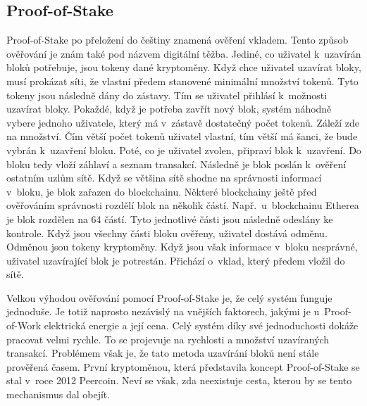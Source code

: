 \documentclass[12pt]{report}			%
\begin{document}
		\subsection{Proof-of-Stake}{
Proof-of-Stake po přeložení do češtiny znamená ověření vkladem. Tento způsob ověřování je znám také pod názvem digitální těžba. Jediné, co uživatel k~uzavírán bloků potřebuje, jsou tokeny dané kryptoměny. Když chce uživatel uzavírat bloky, musí prokázat síti, že vlastní předem stanovené minimální množství tokenů. Tyto tokeny jsou následně dány do zástavy. Tím se uživatel přihlásí k~možnosti uzavírat bloky. Pokaždé, když je potřeba zavřít nový blok, systém náhodně vybere jednoho uživatele, který má v~zástavě dostatečný počet tokenů. Záleží zde na množství. Čím větší počet tokenů uživatel vlastní, tím větší má šanci, že bude vybrán k~uzavření bloku. Poté, co je uživatel zvolen, připraví blok k~uzavření. Do bloku tedy vloží záhlaví a seznam transakcí. Následně je blok poslán k~ověření ostatním uzlům sítě. Když se většina sítě shodne na správnosti informací v~bloku, je blok zařazen do blockchainu. Některé blockchainy ještě před ověřováním správnosti rozdělí blok na několik částí. Např.\, u~blockchainu Etherea je blok rozdělen na 64 částí. Tyto jednotlivé části jsou následně odeslány ke kontrole. Když jsou všechny části bloku ověřeny, uživatel dostává odměnu. Odměnou jsou tokeny kryptoměny. Když jsou však informace v~bloku nesprávné, uživatel uzavírající blok je potrestán. Přichází o~vklad, který předem vložil do sítě.	\cite{Weston2021}

Velkou výhodou ověřování pomocí Proof-of-Stake je, že celý systém funguje jednoduše. Je totiž naprosto nezávislý na vnějších faktorech, jakými je u~Proof-of-Work elektrická energie a její cena. Celý systém díky své jednoduchosti dokáže pracovat velmi rychle. To se projevuje na rychlosti a množství uzavíraných transakcí. Problémem však je, že tato metoda uzavírání bloků není stále prověřená časem. První kryptoměnou, která představila koncept Proof-of-Stake se stal v~roce 2012 Peercoin. Neví se však, zda neexistuje cesta, kterou by se tento mechanismus dal obejít. \cite{Weston2021} \cite{Bashir2018}
		}
\end{document}
